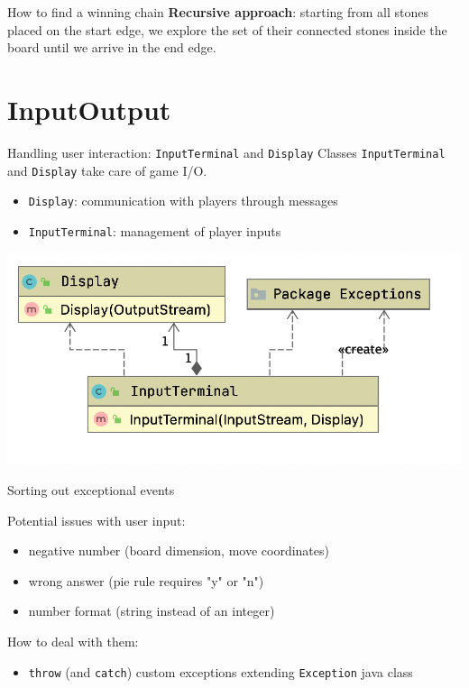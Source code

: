 \documentclass{beamer}
\begin{document}
\begin{frame}{How to find a winning chain}
{		\textbf{Recursive approach}: starting from all stones placed on the start edge, we explore the set of their connected stones inside the board until we arrive in the end edge.
	}



\end{frame}



\section{InputOutput}

\begin{frame}{Handling user interaction: \texttt{InputTerminal} and \texttt{Display}}
 Classes \texttt{InputTerminal} and \texttt{Display} take care of game I/O.

 \begin{itemize}
  \item \texttt{Display}: communication with players through messages
   \item \texttt{InputTerminal}: management of player inputs
 \end{itemize}
 
   \begin{center}
       \includegraphics[scale=0.45]{images/inputoutput.png}
      \end{center}
\end{frame}

\begin{frame}{Sorting out exceptional events}

 Potential issues with user input:
 \begin{itemize}
  \item negative number (board dimension, move coordinates)
  \item wrong answer (pie rule requires "y" or "n")
  \item number format (string instead of an integer)
 \end{itemize}
 
 \vspace{0.7cm}
 
 How to deal with them:
 \begin{itemize}
  \item \texttt{throw} (and \texttt{catch}) custom exceptions extending \texttt{Exception} java class
 \end{itemize}
 
\end{frame}
\end{document}

